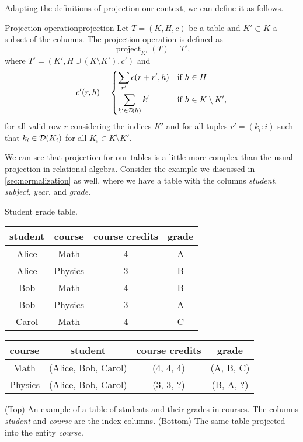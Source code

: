 Adapting the definitions of projection our context, we can define it as follows.

\begin{defbox}{Projection operation}{projection}
  Let $T = (K, H, c)$ be a table and $K' \subset K$ a subset of the columns.  The
  projection operation is defined as \[
    \operatorname{project}_{K'}(T) = T'\text{,}
  \] where $T' = (K', H \cup (K \setminus K'), c')$ and \[
    c'(r, h) = \begin{dcases}
      \sum_{r'} c(r + r', h) & \text{if } h \in H \\
      \sum_{k' \in \mathcal{D}\!\left(h\right)} k' & \text{if } h \in K \setminus K'\text{,}
    \end{dcases}
  \] for all valid row $r$ considering the indices $K'$ and for all tuples $r' = (k_i :
  i)$ such that $k_i \in \mathcal{D}\!\left(K_i\right)$ for all $K_i \in K \setminus K'$.
\end{defbox}

We can see that projection for our tables is a little more complex than the usual
projection in relational algebra.  Consider the example we discussed in
\cref{sec:normalization} as well, where we have a table with the columns \emph{student},
\emph{subject}, \emph{year}, and \emph{grade}.

\begin{tablebox}[label=tab:student-grade-handling]{Student grade table.}
  \centering
  \begin{tabular}{cccc}
    \toprule
    \textbf{student} & \textbf{course} & \textbf{course credits} & \textbf{grade} \\
    \midrule
    Alice & Math & 4 & A \\
    Alice & Physics & 3 & B \\
    Bob & Math & 4 & B \\
    Bob & Physics & 3 & A \\
    Carol & Math & 4 & C \\
    \bottomrule
  \end{tabular}

  \vspace{1em}
  \begin{tabular}{cccc}
    \toprule
    \textbf{course} & \textbf{student} & \textbf{course credits} & \textbf{grade} \\
    \midrule
    Math & (Alice, Bob, Carol) & (4, 4, 4) & (A, B, C) \\
    Physics & (Alice, Bob, Carol) & (3, 3, ?) & (B, A, ?) \\
    \bottomrule
  \end{tabular}
  \tcblower
  (Top) An example of a table of students and their grades in courses.  The columns
  \emph{student} and \emph{course} are the index columns. (Bottom) The same table
  projected into the entity \emph{course}.
\end{tablebox}

